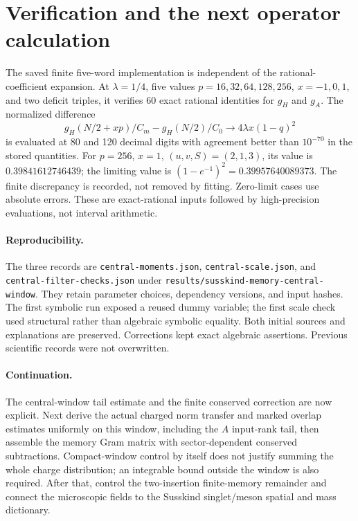 \documentclass[11pt,a4paper]{article}
\begin{document}
\newpage
\section{Verification and the next operator calculation}
The saved finite five-word implementation is independent of the
rational-coefficient expansion. At $\lambda=1/4$, five values
$p=16,32,64,128,256$, $x=-1,0,1$, and two deficit triples,
it verifies 60 exact rational identities for $g_H$ and $g_A$.
The normalized difference
\begin{equation}
 g_H(N/2+xp)/C_m-g_H(N/2)/C_0
 \longrightarrow4\lambda x(1-q)^2
\end{equation}
is evaluated at 80 and 120 decimal digits with agreement better
than $10^{-70}$ in the stored quantities. For $p=256$, $x=1$,
$(u,v,S)=(2,1,3)$, its value is $0.39841612746439$;
the limiting value is $(1-e^{-1})^2=0.39957640089373$.
The finite discrepancy is recorded, not removed by fitting.
Zero-limit cases use absolute errors. These are exact-rational
inputs followed by high-precision evaluations, not interval arithmetic.

\paragraph{Reproducibility.}
The three records are \texttt{central-moments.json},
\texttt{central-scale.json}, and \texttt{central-filter-checks.json}
under \texttt{results/susskind-memory-central-window}.
They retain parameter choices, dependency versions, and input hashes.
The first symbolic run exposed a reused dummy variable; the first
scale check used structural rather than algebraic symbolic equality.
Both initial sources and explanations are preserved. Corrections
kept exact algebraic assertions. Previous scientific records were
not overwritten.

\paragraph{Continuation.}
The central-window tail estimate and the finite conserved
correction are now explicit. Next derive the actual charged
norm transfer and marked overlap estimates uniformly on this
window, including the $A$ input-rank tail, then assemble the
memory Gram matrix with sector-dependent conserved subtractions.
Compact-window control by itself does not justify summing the
whole charge distribution; an integrable bound outside the window
is also required. After that, control the two-insertion finite-memory
remainder and connect the microscopic fields to the Susskind
singlet/meson spatial and mass dictionary.
\end{document}
